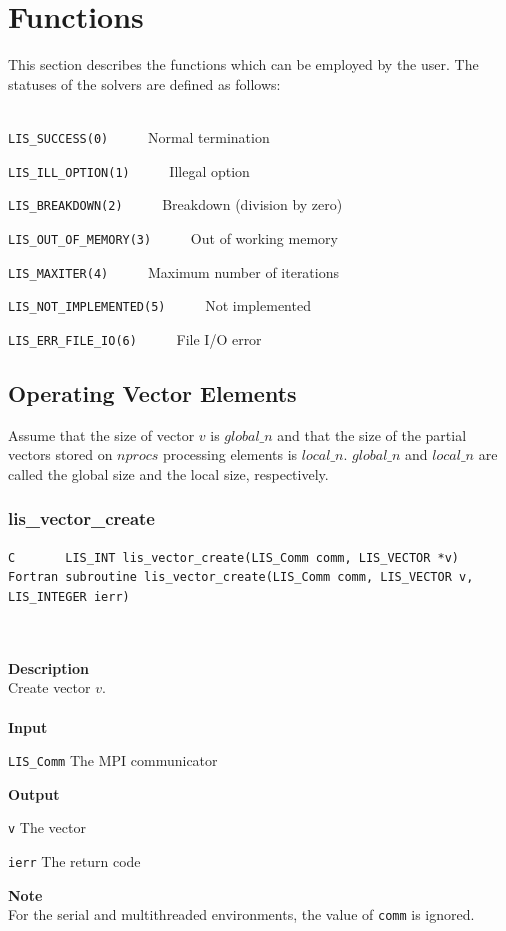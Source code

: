 \documentclass[a4paper]{article}
\newcommand{\namelistlabel}[1]{\mbox{#1}\hfill}
\newenvironment{namelist}[1]{%
\begin{list}{}
  {\let\makelabel\namelistlabel
  \settowidth{\labelwidth}{#1}
  \setlength{\leftmargin}{1.1\labelwidth}}
  }{%
\end{list}}
\begin{document}
\newpage
\section{Functions}\label{sec:func}
This section describes the functions which can be employed by the user.
The statuses of the solvers are defined as follows: 
\\ \\ 
\noindent
\begin{namelist}{XXXXXXXXXXXXXXXXXXXX}
\item[\tt LIS\_SUCCESS(0)] ~~~~~Normal termination
\item[\tt LIS\_ILL\_OPTION(1)] ~~~~~Illegal option
\item[\tt LIS\_BREAKDOWN(2)] ~~~~~Breakdown (division by zero)
\item[\tt LIS\_OUT\_OF\_MEMORY(3)] ~~~~~Out of working memory
\item[\tt LIS\_MAXITER(4)] ~~~~~Maximum number of iterations
\item[\tt LIS\_NOT\_IMPLEMENTED(5)] ~~~~~Not implemented
\item[\tt LIS\_ERR\_FILE\_IO(6)] ~~~~~File I/O error
\end{namelist}

\newpage
\subsection{Operating Vector Elements}
Assume that the size of vector $v$ is $global\_n$ and that the size
of the partial vectors stored on $nprocs$ processing elements 
is $local\_n$. $global\_n$ and $local\_n$ 
are called the global size and the local size, respectively.

\subsubsection{lis\_vector\_create}
\begin{screen}
\verb|C       LIS_INT lis_vector_create(LIS_Comm comm, LIS_VECTOR *v)|\\
\verb|Fortran subroutine lis_vector_create(LIS_Comm comm, LIS_VECTOR v, LIS_INTEGER ierr)| 
\end{screen}
\\ \\
\noindent
{\bf Description}\\
\indent
Create vector $v$.
\\ \\
\noindent
{\bf Input}
\begin{namelist}{XXXXXXXXXXXXXXXXXXXX}
\item[\tt LIS\_Comm] The MPI communicator
\end{namelist}
{\bf Output}
\begin{namelist}{XXXXXXXXXXXXXXXXXXXX}
\item[\tt v] The vector
\item[\tt ierr] The return code
\end{namelist}
{\bf Note}\\
\indent
For the serial and multithreaded environments, the value of {\tt comm} is ignored.
\end{document}
